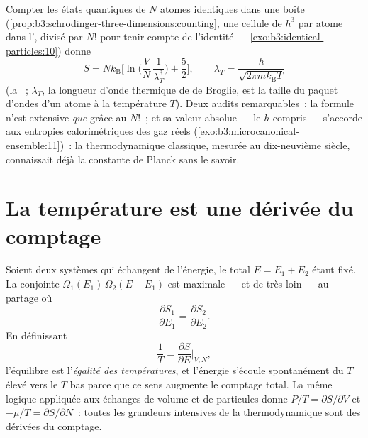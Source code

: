 \begin{proposition}\label{prop:b3:microcanonical-ensemble:gas}
Compter les états quantiques de $N$ atomes identiques dans une boîte
(\cref{prop:b3:schrodinger-three-dimensions:counting}, une cellule de
$h^3$ par atome dans l', divisé par $N!$ pour tenir
compte de l'identité --- \cref{exo:b3:identical-particles:10}) donne
\[
S = Nk_{\text{B}}\Big[\ln\Big(\frac VN\,\frac1{\lambda_T^3}\Big)
 + \frac52\Big] , \qquad
\lambda_T = \frac{h}{\sqrt{2\pi mk_{\text{B}}T}}
\]
(la \emph{}~; $\lambda_T$, la longueur
d'onde thermique de de Broglie, est la taille du paquet d'ondes d'un
atome à la température $T$). Deux audits remarquables~: la formule
n'est extensive \emph{que} grâce au $N!$~; et sa valeur absolue ---
le $h$ compris --- s'accorde aux entropies calorimétriques des gaz
réels (\cref{exo:b3:microcanonical-ensemble:11})~: la thermodynamique
classique, mesurée au dix-neuvième siècle, connaissait déjà la
constante de Planck sans le savoir.
\end{proposition}
\admitted

\section{La température est une dérivée du comptage}

\begin{theorem}\label{thm:b3:microcanonical-ensemble:temperature}
Soient deux systèmes qui échangent de l'énergie, le total
$E = E_1 + E_2$ étant fixé. La  conjointe
$\Omega_1(E_1)\,\Omega_2(E - E_1)$ est maximale --- et de très loin
--- au partage où
\[
\frac{\partial S_1}{\partial E_1} =
\frac{\partial S_2}{\partial E_2} .
\]
En définissant
\[
\frac1T = \frac{\partial S}{\partial E}\bigg|_{V,N} ,
\]
l'équilibre est l'\emph{égalité des températures}, et l'énergie
s'écoule spontanément du $T$ élevé vers le $T$ bas parce que ce sens
augmente le comptage total. La même logique appliquée aux échanges de
volume et de particules donne $P/T = \partial S/\partial V$ et $-\mu/T
= \partial S/\partial N$~: toutes les grandeurs intensives de la
thermodynamique sont des dérivées du comptage.
\end{theorem}

